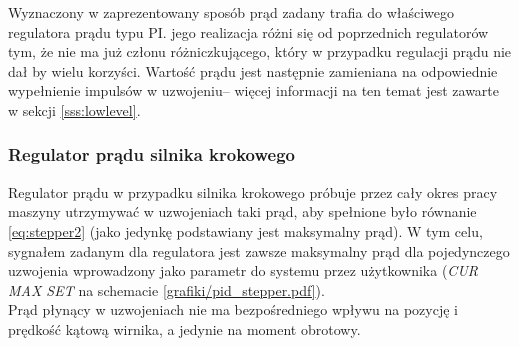 Wyznaczony w zaprezentowany sposób prąd zadany trafia do właściwego regulatora prądu typu PI. jego realizacja różni się od poprzednich regulatorów tym, że nie ma już członu różniczkującego, który w przypadku regulacji prądu nie dał by wielu korzyści. Wartość prądu jest następnie zamieniana na odpowiednie wypełnienie impulsów w uzwojeniu-- więcej informacji na ten temat jest zawarte w sekcji \ref{sss:lowlevel}.

\subsubsection{Regulator prądu silnika krokowego}

Regulator prądu w przypadku silnika krokowego próbuje przez cały okres pracy maszyny utrzymywać w uzwojeniach taki prąd, aby spełnione było równanie \ref{eq:stepper2} (jako jedynkę podstawiany jest maksymalny prąd). W tym celu, sygnałem zadanym dla regulatora jest zawsze maksymalny prąd dla pojedynczego uzwojenia wprowadzony jako parametr do systemu przez użytkownika ({\it CUR MAX SET} na schemacie \ref{grafiki/pid_stepper.pdf}). \\

Prąd płynący w uzwojeniach nie ma bezpośredniego wpływu na pozycję i prędkość kątową wirnika, a jedynie na moment obrotowy.















\clearpage